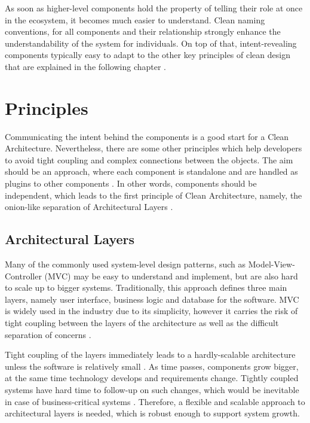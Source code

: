 \documentclass[conference]{IEEEtran}
\begin{document}
As soon as higher-level components hold the property of telling their role at once in the ecosystem, it becomes much easier to understand. Clean naming conventions, for all components and their relationship strongly enhance the understandability of the system for individuals. On top of that, intent-revealing components typically easy to adapt to the other key principles of clean design that are explained in the following chapter \cite{cleancode}.

\section{Principles}
Communicating the intent behind the components is a good start for a Clean Architecture. Nevertheless, there are some other principles which help developers to avoid tight coupling and complex connections between the objects. The aim should be an approach, where each component is standalone and are handled as plugins to other components \cite{cleancode} \cite{cleanarchitecture}. In other words, components should be independent, which leads to the first principle of Clean Architecture, namely, the onion-like separation of Architectural Layers \cite{cleanarchitecture}. 

\subsection{Architectural Layers}
Many of the commonly used system-level design patterns, such as Model-View-Controller (MVC) may be easy to understand and implement, but are also hard to scale up to bigger systems. Traditionally, this approach defines three main layers, namely user interface, business logic and database for the software. MVC is widely used in the industry due to its simplicity, however it carries the risk of tight coupling between the layers of the architecture as well as the difficult separation of concerns \cite{onionarchitecture}. 

Tight coupling of the layers immediately leads to a hardly-scalable architecture unless the software is relatively small \cite{onionarchitecture}. As time passes, components grow bigger, at the same time technology develops and requirements change. Tightly coupled systems have hard time to follow-up on such changes, which would be inevitable in case of business-critical systems \cite{onionarchitecture}. Therefore, a flexible and scalable approach to architectural layers is needed, which is robust enough to support system growth. 
\end{document}
